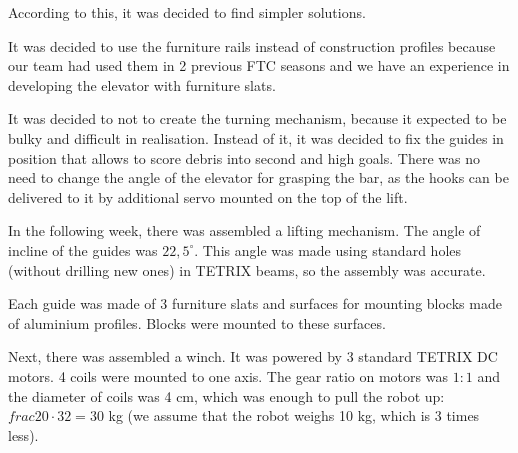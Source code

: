 \begin{enumerate*}
  According to this, it was decided to find simpler solutions.
  \begin{enumerate*}
  	
  	\item It was decided to use the furniture rails instead of construction profiles because our team had used them in 2 previous FTC seasons and we have an experience in developing the elevator with furniture slats.
  	
  	\item It was decided to not to create the turning mechanism, because it expected to be bulky and difficult in realisation. Instead of it, it was decided to fix the guides in position that allows to score debris into second and high goals. There was no need to change the angle of the elevator for grasping the bar, as the hooks can be delivered to it by additional servo mounted on the top of the lift.
  	
  \end{enumerate*}

  \item In the following week, there was assembled a lifting mechanism. The angle of incline of the guides was $22,5^\circ$. This angle was made using standard holes (without drilling new ones) in TETRIX beams, so the assembly was accurate.

  Each guide was made of 3 furniture slats and surfaces for mounting blocks made of aluminium profiles. Blocks were mounted to these surfaces.

  Next, there was assembled a winch. It was powered by 3 standard TETRIX DC motors. 4 coils were mounted to one axis. The gear ratio on motors was $1:1$ and the diameter of coils was 4 cm, which was enough to pull the robot up: $frac{20 \cdot 3}{2} = 30$ kg (we assume that the robot weighs 10 kg, which is 3 times less).


\end{enumerate*}
